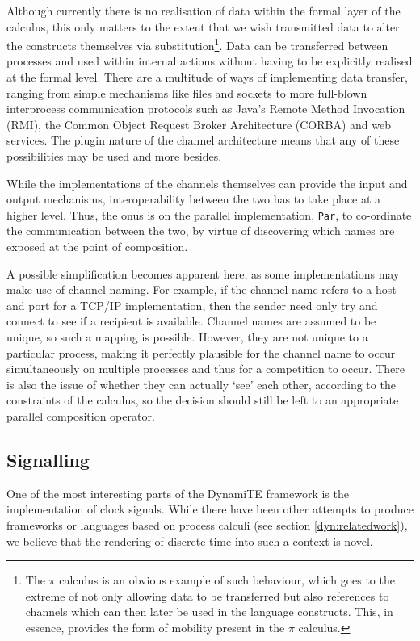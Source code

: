 Although currently there is no realisation of data within the formal
layer of the calculus, this only matters to the extent that we wish
transmitted data to alter the constructs themselves via
substitution\footnote{The $\pi$ calculus \cite{picalctutorial} is an
obvious example of such behaviour, which goes to the extreme of not only
allowing data to be transferred but also references to channels which
can then later be used in the language constructs.  This, in essence,
provides the form of mobility present in the $\pi$ calculus.}.  Data can
be transferred between processes and used within internal actions
without having to be explicitly realised at the formal level.  There are
a multitude of ways of implementing data transfer, ranging from simple
mechanisms like files and sockets to more full-blown interprocess
communication protocols such as Java's Remote Method Invocation (RMI),
the Common Object Request Broker Architecture (CORBA) and web services.
The plugin nature of the channel architecture means that any of these
possibilities may be used and more besides.

While the implementations of the channels themselves can provide the
input and output mechanisms, interoperability between the two has to
take place at a higher level.  Thus, the onus is on the parallel
implementation, \texttt{Par}, to co-ordinate the communication between
the two, by virtue of discovering which names are exposed at the point
of composition.

A possible simplification becomes apparent here, as some implementations
may make use of channel naming.  For example, if the channel name refers
to a host and port for a TCP/IP implementation, then the sender need
only try and connect to see if a recipient is available.  Channel names
are assumed to be unique, so such a mapping is possible.  However, they
are not unique to a particular process, making it perfectly plausible
for the channel name to occur simultaneously on multiple processes and
thus for a competition to occur.  There is also the issue of whether
they can actually `see' each other, according to the constraints of the
calculus, so the decision should still be left to an appropriate
parallel composition operator.

\subsection{Signalling}
\label{dyn:signalling}

One of the most interesting parts of the DynamiTE framework is the
implementation of clock signals.  While there have been other attempts
to produce frameworks or languages based on process calculi (see section
\ref{dyn:relatedwork}), we believe that the rendering of discrete time into
such a context is novel.

